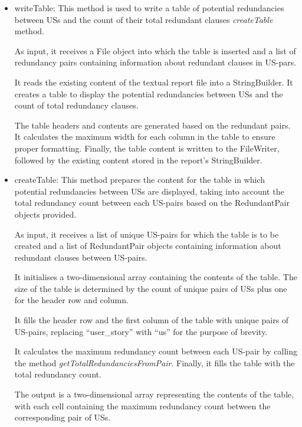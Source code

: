 \begin{itemize}
	\item writeTable: This method is used to write a table of potential redundancies between USs and the count of their total redundant clauses \textit{createTable} method.%
	
	As input, it receives a File object into which the table is inserted and a list of redundancy pairs containing information about redundant clauses in US-pars.
	
	It reads the existing content of the textual report file into a StringBuilder. It creates a table to display the potential redundancies between USs and the count of total redundancy clauses.
	
	The table headers and contents are generated based on the redundant pairs. It calculates the maximum width for each column in the table to ensure proper formatting. Finally, the table content is written to the FileWriter, followed by the existing content stored in the report's StringBuilder.
	
	\item createTable: This method prepares the content for the table in which potential redundancies between USs are displayed, taking into account the total redundancy count between each US-pairs based on the RedundantPair objects provided.
	
	As input, it receives a list of unique US-pairs for which the table is to be created and a list of RedundantPair objects containing information about redundant clauses between US-pairs.
	
	It initialises a two-dimensional array containing the contents of the table. The size of the table is determined by the count of unique pairs of USs plus one for the header row and column.
	
	It fills the header row and the first column of the table with unique pairs of US-pairs, replacing \enquote{user\_story} with \enquote{us} for the purpose of brevity.
	
	It calculates the maximum redundancy count between each US-pair by calling the method \textit{getTotalRedundanciesFromPair}. Finally, it fills the table with the total redundancy count. 
	
	The output is a two-dimensional array representing the contents of the table, with each cell containing the maximum redundancy count between the corresponding pair of USs.
	

\end{itemize}
